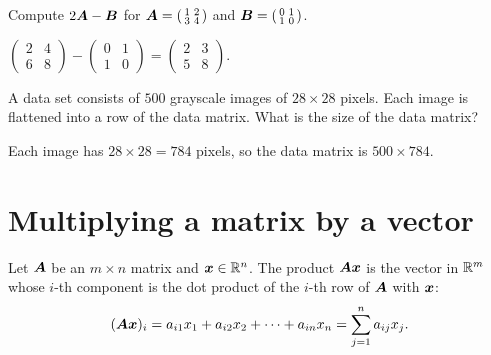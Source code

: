 \begin{exercise}
Compute $2\bm{A} - \bm{B}$ for
$\bm{A} = \left(\begin{smallmatrix} 1 & 2\\ 3 & 4\end{smallmatrix}\right)$ and
$\bm{B} = \left(\begin{smallmatrix} 0 & 1\\ 1 & 0\end{smallmatrix}\right)$.
\end{exercise}
\begin{solution}
$\left(\begin{smallmatrix} 2 & 4\\ 6 & 8\end{smallmatrix}\right) -
\left(\begin{smallmatrix} 0 & 1\\ 1 & 0\end{smallmatrix}\right) =
\left(\begin{smallmatrix} 2 & 3\\ 5 & 8\end{smallmatrix}\right)$.
\end{solution}

\begin{exercise}
A data set consists of $500$ grayscale images of $28\times28$ pixels. Each
image is flattened into a row of the data matrix. What is the size of the
data matrix?
\end{exercise}
\begin{solution}
Each image has $28 \times 28 = 784$ pixels, so the data matrix is
$500 \times 784$.
\end{solution}

\section{Multiplying a matrix by a vector}\label{sec:matrix-vector}

\begin{definition}\label{def:matrix-vector}
Let $\bm{A}$ be an $m\times n$ matrix and $\bm{x} \in \mathbb{R}^n$. The product $\bm{A}\bm{x}$ is
the vector in $\mathbb{R}^m$ whose $i$-th component is the dot product of the $i$-th
row of $\bm{A}$ with $\bm{x}$:
\[
  (\bm{A}\bm{x})_i = a_{i1}x_1 + a_{i2}x_2 + \dots + a_{in}x_n
  = \sum_{j=1}^{n} a_{ij}x_j .
\]
\end{definition}

